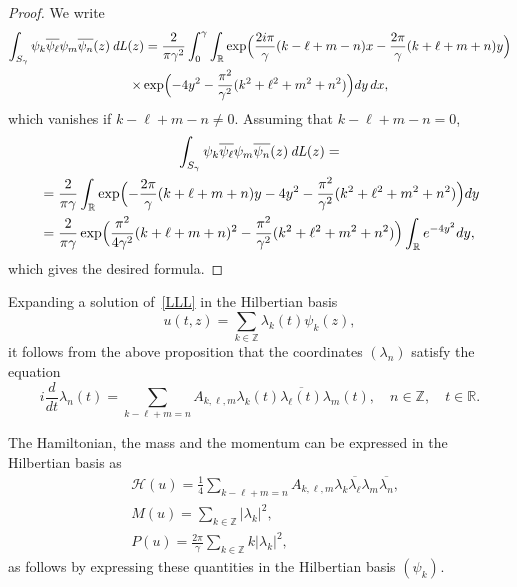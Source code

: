 \documentclass[JEP,XML,SOM,Unicode,NoFloatCountersInSection,published]{cedram}
\DeclareMathOperator{\dL}{\mathit{dL}}
\theoremstyle{definition}
\let\e e
\let\EE\exp
\let\ov\overline
\newcommand\R{\mathbb R}
\newcommand\Z{\mathbb Z}
\begin{document}
\begin{proof} We write\vspace*{-3pt}
\begin{multline*}
\int_{S_{\gamma}} \psi_{k}\ov{\psi_{\ell}} \psi_{m}\ov{\psi_{n}}(z)\dL(z)
= \frac{2}{\pi \gamma^2}\int_{0}^{\gamma}\int_{\R}
\EE\Bigl(\frac{2i \pi}{\gamma}(k-\ell+m-n)x -\frac{2\pi}{\gamma}(k+\ell+m+n)y\Bigr)\\
\times \EE\Bigl(-4y^2-\frac{\pi^2}{\gamma^2}(k^2+\ell^2+m^2+n^2)\Bigr) dy \, dx,
\end{multline*}
which vanishes if $k-\ell+m-n \neq 0$. Assuming that $k-\ell+m-n =0$,\vspace*{-3pt}
\begin{multline*}
\int_{S_{\gamma}} \psi_{k}\ov{\psi_{\ell}} \psi_{m}\ov{\psi_{n}}(z)\dL(z)=\\
\begin{aligned}
&= \frac{2}{\pi \gamma} \int_{\R} \EE\Bigl(-\frac{2\pi}{\gamma}(k+\ell+m+n)y-4y^2-\frac{\pi^2}{\gamma^2}(k^2+\ell^2+m^2+n^2)\Bigr) dy\\
&= \frac{2}{\pi \gamma}\EE\Bigl(\frac{\pi^2}{4 \gamma^2}(k+\ell+m+n)^2-\frac{\pi^2}{\gamma^2}(k^2+\ell^2+m^2+n^2)\Bigr) \int_{\R} \e^{ -4y^2} dy,
\end{aligned}
\end{multline*}
which gives the desired formula.
\end{proof}

Expanding a solution of~\eqref{LLL} in the Hilbertian basis
\[
u(t,z) = \sum_{k \in \mathbb{Z}} \lambda_k(t) \psi_k(z),
\]
it follows from the above proposition that the coordinates $(\lambda_n)$ satisfy the equation
\begin{equation}\label{eq_lambda_k}
i\frac{d}{dt} \lambda_n(t) = \sum_{k - \ell + m = n} A_{k,\ell,m} \lambda_{k}(t) \ov{\lambda_{\ell}(t)} \lambda_{m}(t), \quad n \in \Z, \quad t\in \R.
\end{equation}

The Hamiltonian, the mass and the momentum can be expressed in the Hilbertian basis as\vspace*{-3pt}
\begin{align*}
& \mathcal{H}(u) = \frac14 \sum_{k - \ell + m = n} A_{k,\ell,m} \lambda_{k} \ov{\lambda_{\ell}} \lambda_{m} \ov{\lambda_{n}}, \\
& M(u) = \sum_{k \in \mathbb{Z}} | \lambda_k|^2, \\
& P(u) =\frac{2\pi}{\gamma} \sum_{k \in \mathbb{Z}} k | \lambda_k|^2,
\end{align*}
as follows by expressing these quantities in the Hilbertian basis $(\psi_k)_{}$. 
\end{document}
